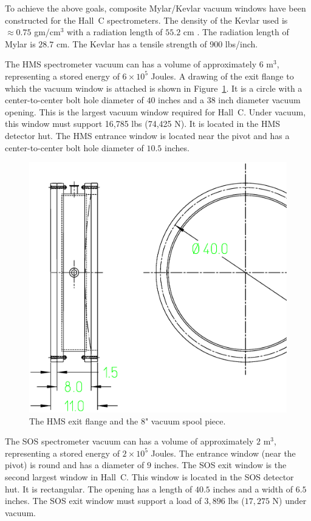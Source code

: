 To achieve the above goals,
composite Mylar/Kevlar vacuum windows have been constructed for the
Hall~C spectrometers. The density of the Kevlar used
is $\approx 0.75$ gm/cm$^3$ with a radiation
length of $55.2$ cm \cite{rdup1}. The radiation length
of Mylar is $28.7$ cm. The Kevlar has a tensile strength of 900 lbs/inch.

The HMS spectrometer vacuum can has a volume
of approximately $6$ m$^3$, representing a stored energy of $6 \times 10^5$
Joules. A drawing of the exit flange to which the vacuum
window is attached is shown in Figure~\ref{fig:hms_flange}.  It is a
circle with a center-to-center bolt hole diameter of $40$ inches
and a $38$ inch diameter vacuum opening. This is the largest vacuum window
required for Hall~C.
Under vacuum, this window must support 16,785
lbs (74,425 N). It is located in the HMS detector hut. The HMS
entrance window is located near the pivot and has a center-to-center
bolt hole diameter of $10.5$ inches.

\begin{figure}
\includegraphics[width=6in]{figHMSflange.eps}
\caption{The HMS exit flange and the 8" vacuum spool piece. \label{fig:hms_flange}}
\end{figure}

The SOS spectrometer vacuum can has a volume of approximately $2$ m$^3$,
representing a stored energy of $2 \times 10^5$ Joules. The entrance
window (near the pivot) is round and has a diameter of $9$ inches.
The SOS exit window is the second largest window in Hall~C. This
window is located in the SOS detector hut. It is rectangular.
The opening has a length of $40.5$ inches and a width of $6.5$ inches.
The SOS exit
window must support a load of $3,896$ lbs ($17,275$ N) under vacuum.

